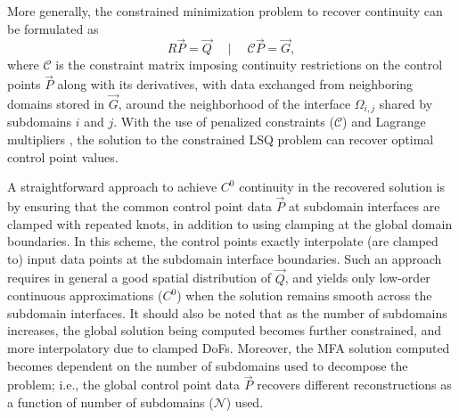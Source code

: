 More generally, the constrained minimization problem to recover continuity \cite{nurbs-book} can be formulated as 
%
\begin{equation}
	R \vec{P} = \vec{Q} \quad \mid \quad \mathcal{C} \vec{P} = \vec{G}, \label{eq:global-constrained-problem}
\end{equation}
%
where $\mathcal{C}$ is the constraint matrix imposing continuity restrictions on the control points $\vec{P}$ along with its derivatives, with data exchanged from neighboring domains stored in $\vec{G}$, around the neighborhood of the interface $\Omega_{i,j}$ shared by subdomains $i$ and $j$.
With the use of penalized constraints ($\mathcal{C}$) and Lagrange multipliers \cite{dornisch2011, paul2020}, the solution to the constrained LSQ problem can recover optimal control point values. 

A straightforward approach to achieve $C^0$ continuity in the recovered solution is by ensuring that the common control point data $\vec{P}$ at subdomain interfaces are clamped with repeated knots, in addition to using clamping at the global domain boundaries. In this scheme, the control points exactly interpolate (are clamped to) input data points at the subdomain interface boundaries. Such an approach requires in general a good spatial distribution of $\vec{Q}$, and yields only low-order continuous approximations ($C^0$) when the solution remains smooth across the subdomain interfaces. It should also be noted that as the number of subdomains increases, the global solution being computed becomes further constrained, and more interpolatory due to clamped DoFs. Moreover, the MFA solution computed becomes dependent on the number of subdomains used to decompose the problem; i.e., the global control point data $\vec{P}$ recovers different reconstructions as a function of number of subdomains ($\mathcal{N}$) used.


